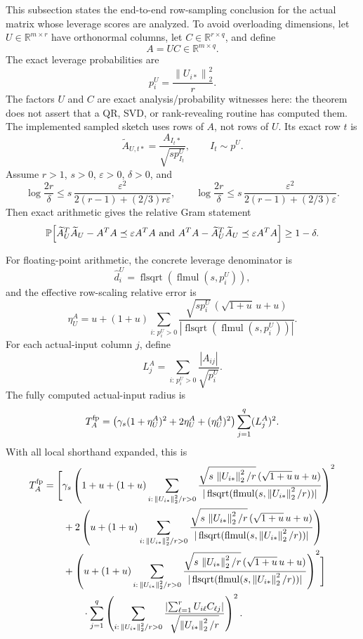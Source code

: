 \documentclass[11pt]{article}
\newcommand{\R}{\mathbb{R}}
\newcommand{\Prob}{\mathbb{P}}
\newcommand{\Norm}[1]{\left\lVert #1\right\rVert_2}
\newcommand{\eps}{\varepsilon}
\theoremstyle{remark}
\begin{document}
This subsection states the end-to-end row-sampling conclusion for the actual
matrix whose leverage scores are analyzed.  To avoid overloading dimensions,
let \(U\in\R^{m\times r}\) have orthonormal columns, let
\(C\in\R^{r\times q}\), and define
\[
  A=UC\in\R^{m\times q}.
\]
The exact leverage probabilities are
\[
  p_i^U=\frac{\Norm{U_{i*}}^2}{r}.
\]
The factors \(U\) and \(C\) are exact analysis/probability witnesses here:
the theorem does not assert that a QR, SVD, or rank-revealing routine has
computed them.  The implemented sampled sketch uses rows of \(A\), not rows of
\(U\).  Its exact row \(t\) is
\[
  \widetilde A_{U,t*}
  =
  \frac{A_{I_t*}}{\sqrt{s p_{I_t}^U}},
  \qquad I_t\sim p^U .
\]
Assume \(r>1\), \(s>0\), \(\eps>0\), \(\delta>0\), and
\[
  \log\frac{2r}{\delta}
  \le
  s\,\frac{\eps^2}{2(r-1)+(2/3)r\eps},
  \qquad
  \log\frac{2r}{\delta}
  \le
  s\,\frac{\eps^2}{2(r-1)+(2/3)\eps}.
\]
Then exact arithmetic gives the relative Gram statement
\[
  \Prob\!\left[
    \widetilde A_U^T\widetilde A_U-A^TA
      \preceq \eps A^TA
    \ \hbox{and}\
    A^TA-\widetilde A_U^T\widetilde A_U
      \preceq \eps A^TA
  \right]\ge 1-\delta .
\]

For floating-point arithmetic, the concrete leverage denominator is
\[
  \widehat d_i^U
  =
  \operatorname{flsqrt}(\operatorname{flmul}(s,p_i^U)),
\]
and the effective row-scaling relative error is
\[
  \eta_U^A
  =
  u+(1+u)
  \sum_{i:\,p_i^U>0}
  \frac{\sqrt{s p_i^U}\,(\sqrt{1+u}\,u+u)}
       {|\operatorname{flsqrt}(\operatorname{flmul}(s,p_i^U))|}.
\]
For each actual-input column \(j\), define
\[
  L_j^A
  =
  \sum_{i:\,p_i^U>0}\frac{|A_{ij}|}{\sqrt{p_i^U}}.
\]
The fully computed actual-input radius is
\[
  T_A^{\rm fp}
  =
  \left(
    \gamma_s(1+\eta_U^A)^2+2\eta_U^A+(\eta_U^A)^2
  \right)
  \sum_{j=1}^q (L_j^A)^2 .
\]
With all local shorthand expanded, this is
\[
\begin{aligned}
T_A^{\rm fp}
&=
\Biggl[
\gamma_s
\left(
1+u+(1+u)
  \sum_{i:\,\Norm{U_{i*}}^2/r>0}
  \frac{\sqrt{s\,\Norm{U_{i*}}^2/r}\,(\sqrt{1+u}\,u+u)}
       {|\operatorname{flsqrt}(\operatorname{flmul}(s,\Norm{U_{i*}}^2/r))|}
\right)^2 \\
&\qquad
+2\left(
u+(1+u)
  \sum_{i:\,\Norm{U_{i*}}^2/r>0}
  \frac{\sqrt{s\,\Norm{U_{i*}}^2/r}\,(\sqrt{1+u}\,u+u)}
       {|\operatorname{flsqrt}(\operatorname{flmul}(s,\Norm{U_{i*}}^2/r))|}
\right) \\
&\qquad
+\left(
u+(1+u)
  \sum_{i:\,\Norm{U_{i*}}^2/r>0}
  \frac{\sqrt{s\,\Norm{U_{i*}}^2/r}\,(\sqrt{1+u}\,u+u)}
       {|\operatorname{flsqrt}(\operatorname{flmul}(s,\Norm{U_{i*}}^2/r))|}
\right)^2
\Biggr] \\
&\qquad\qquad\cdot
\sum_{j=1}^q
\left(
  \sum_{i:\,\Norm{U_{i*}}^2/r>0}
  \frac{\left|\sum_{\ell=1}^r U_{i\ell}C_{\ell j}\right|}
       {\sqrt{\Norm{U_{i*}}^2/r}}
\right)^2 .
\end{aligned}
\]
\end{document}
